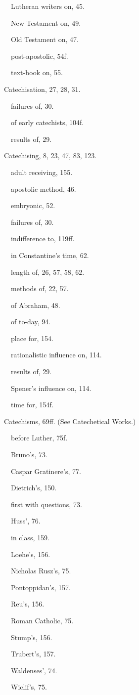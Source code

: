 \begin{originalinhalt}
 Lutheran writers on, 45.

 New Testament on, 49.

 Old Testament on, 47.

 post-apostolic, 54f.

 text-book on, 55.

Catechisation, 27, 28, 31.

 failures of, 30.

 of early catechists, 104f.

 results of, 29.

Catechising, 8, 23, 47, 83, 123.

 adult receiving, 155.

 apostolic method, 46.

 embryonic, 52.

 failures of, 30.

 indifference to, 119ff.

 in Constantine’s time, 62.

 length of, 26, 57, 58, 62.

 methods of, 22, 57.

 of Abraham, 48.

 of to-day, 94.

 place for, 154.

 rationalistic influence on, 114.

 results of, 29.

 Spener’s influence on, 114.

 time for, 154f.

Catechisms, 69ff. (See Catechetical Works.)

 before Luther, 75f.

 Bruno’s, 73.

 Caspar Gratinere’s, 77.

 Dietrich’s, 150.

 first with questions, 73.

 Huss’, 76.

 in class, 159.

 Loehe’s, 156.

 Nicholas Rusz’s, 75.

 Pontoppidan’s, 157.

 Reu’s, 156.

 Roman Catholic, 75.

 Stump’s, 156.

 Trubert’s, 157.

 Waldenses’, 74.

 Wiclif’s, 75.


\end{originalinhalt}

